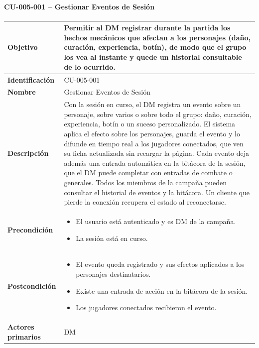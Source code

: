 \paragraph{CU-005-001 -- Gestionar Eventos de Sesión}
{\small\setlength{\tabcolsep}{5pt}\renewcommand{\arraystretch}{1.2}
\begin{longtable}{|>{\raggedright\arraybackslash\bfseries}p{3.2cm}|>{\raggedright\arraybackslash}p{11.9cm}|}
\hline
Objetivo & Permitir al DM registrar durante la partida los hechos mecánicos que afectan a los personajes (daño, curación, experiencia, botín), de modo que el grupo los vea al instante y quede un historial consultable de lo ocurrido. \\ \hline
Identificación & CU-005-001 \\ \hline
Nombre & Gestionar Eventos de Sesión \\ \hline
Descripción & Con la sesión en curso, el DM registra un evento sobre un personaje, sobre varios o sobre todo el grupo: daño, curación, experiencia, botín o un suceso personalizado. El sistema aplica el efecto sobre los personajes, guarda el evento y lo difunde en tiempo real a los jugadores conectados, que ven su ficha actualizada sin recargar la página. Cada evento deja además una entrada automática en la bitácora de la sesión, que el DM puede completar con entradas de combate o generales. Todos los miembros de la campaña pueden consultar el historial de eventos y la bitácora. Un cliente que pierde la conexión recupera el estado al reconectarse. \\ \hline
Precondición & \begin{itemize}[itemsep=2pt,topsep=2pt]
\item El usuario está autenticado y es DM de la campaña.
\item La sesión está en curso.
\end{itemize} \\ \hline
Postcondición & \begin{itemize}[itemsep=2pt,topsep=2pt]
\item El evento queda registrado y sus efectos aplicados a los personajes destinatarios.
\item Existe una entrada de acción en la bitácora de la sesión.
\item Los jugadores conectados recibieron el evento.
\end{itemize} \\ \hline
Actores primarios & DM \\ \hline

\end{longtable}}
